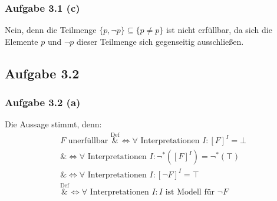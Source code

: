 
\subsubsection{Aufgabe 3.1 (c)}
Nein, denn die Teilmenge $\lbrace p,\neg p\rbrace \subseteq\lbrace p\neq p\rbrace$ ist nicht erfüllbar, da sich die Elemente $p$ und $\neg p$ dieser Teilmenge sich gegenseitig ausschließen.

\subsection{Aufgabe 3.2}
\subsubsection{Aufgabe 3.2 (a)}
Die Aussage stimmt, denn:
\begin{align*}
	F\text{ unerfüllbar }
	\overset{\text{Def}}&{\Longleftrightarrow}
	\forall\text{ Interpretationen } I:[F]^I=\bot\\
	\overset{\text{}}&{\Longleftrightarrow}
	\forall\text{ Interpretationen } I:\neg^\ast([F]^I)=\neg^\ast(\top)\\
	\overset{\text{}}&{\Longleftrightarrow}
	\forall\text{ Interpretationen } I:[\neg F]^I=\top\\
	\overset{\text{Def}}&{\Longleftrightarrow}
	\forall\text{ Interpretationen } I:I\text{ ist Modell für } \neg F
\end{align*}

